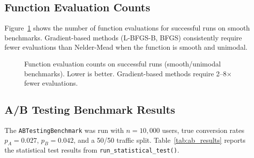 \subsection{Function Evaluation Counts}

Figure~\ref{fig:evals} shows the number of function evaluations for
successful runs on smooth benchmarks. Gradient-based methods (L-BFGS-B,
BFGS) consistently require fewer evaluations than Nelder-Mead when the
function is smooth and unimodal.

\begin{figure}[h]
\centering
{}
\caption{Function evaluation counts on successful runs (smooth/unimodal benchmarks).
         Lower is better. Gradient-based methods require 2--8$\times$ fewer evaluations.}
\label{fig:evals}
\end{figure}

\subsection{A/B Testing Benchmark Results}

The \texttt{ABTestingBenchmark} was run with $n = 10{,}000$ users, true
conversion rates $p_A = 0.027$, $p_B = 0.042$, and a 50/50 traffic split.
Table~\ref{tab:ab_results} reports the statistical test results from
\texttt{run\_statistical\_test()}.

